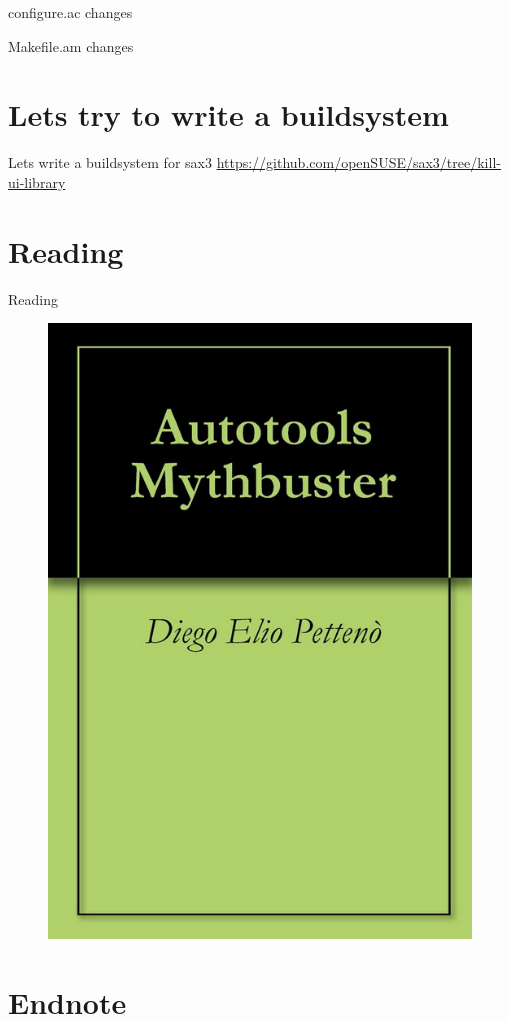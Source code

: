 \documentclass{beamer}
\begin{document}
\begin{frame}[t]{configure.ac changes}
	\begin{small}
	
	\end{small}
\end{frame}

\begin{frame}[t]{Makefile.am changes}
	\begin{small}
	
	\end{small}
\end{frame}

\section{Lets try to write a buildsystem}

\begin{frame}{Lets write a buildsystem for sax3}
\url{https://github.com/openSUSE/sax3/tree/kill-ui-library}
\end{frame}

\section{Reading}

\begin{frame}{Reading}
	\begin{figure}
	\includegraphics[width= 0.4\linewidth]{mythbuster.png}
	\end{figure}
\end{frame}

\section{Endnote}
\end{document}
